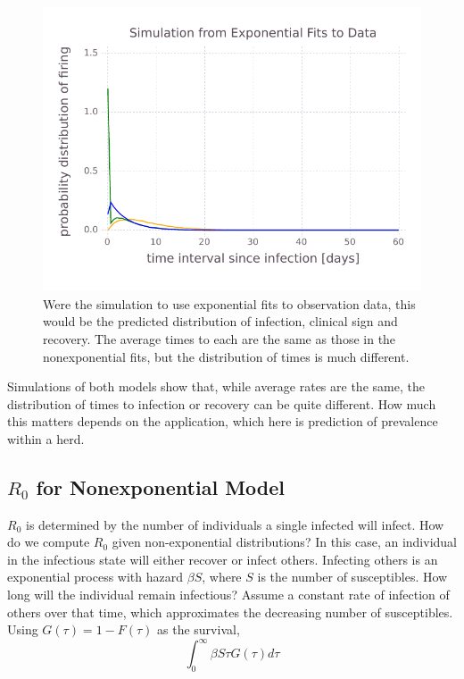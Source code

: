 \documentclass{article}
\begin{document}
\begin{figure}
\centerline{\includegraphics{SimulationfromExponentialFitstoData}}
\caption{Were the simulation to use exponential fits to observation
data, this would be the predicted distribution of infection,
clinical sign and recovery. The average times to each are the same
as those in the nonexponential fits, but the distribution of
times is much different.
\label{fig:individualexponential}}
\end{figure}
Simulations of both models show that, while average rates
are the same, the distribution
of times to infection or recovery can be quite different.
How much this matters depends on the application, which
here is prediction of prevalence within a herd.

\subsection{$R_0$ for Nonexponential Model}
$R_0$ is determined by the number of individuals a single
infected will infect. How do we compute $R_0$ given non-exponential
distributions? In this case, an individual in the
infectious state will either recover or infect others. Infecting
others is an exponential process with hazard $\beta S$, where
$S$ is the number of susceptibles. How long will the individual
remain infectious? Assume a constant rate of infection of others
over that time, which approximates the decreasing number of
susceptibles. Using $G(\tau)=1-F(\tau)$ as the survival,
\begin{equation}
  \int_0^\infty \beta S \tau G(\tau)d\tau
\end{equation}
\end{document}
